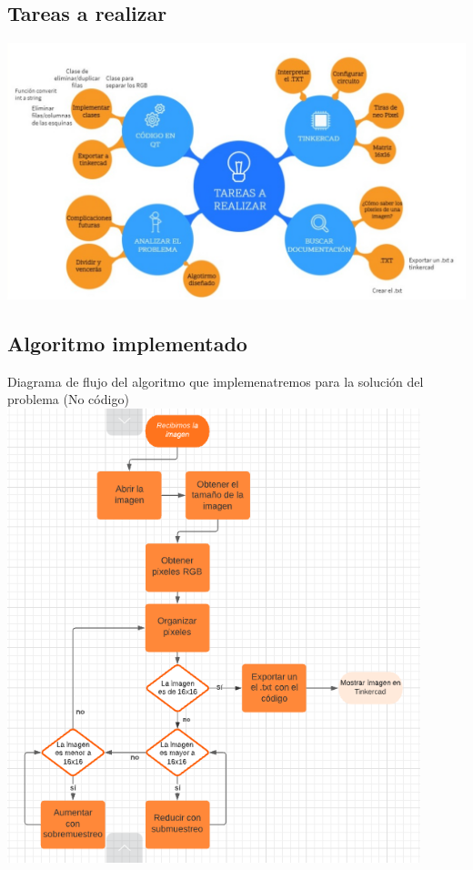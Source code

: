 \documentclass{article}
\begin{document}
\subsection{Tareas a realizar}
\includegraphics[width=15cm]{Imagenes/Esquema.jpeg}

\subsection{Algoritmo implementado}
Diagrama de flujo del algoritmo que implemenatremos para la solución del problema (No código)\\
\includegraphics[width=12cm]{Imagenes/Algo.png}
\end{document}

